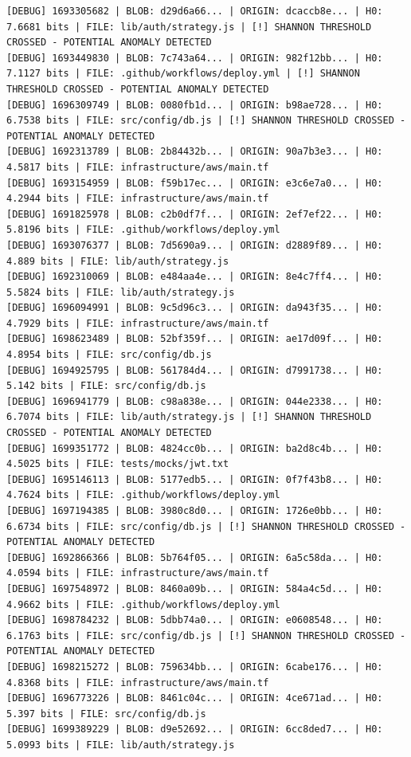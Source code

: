 \documentclass[12pt, a4paper, oneside]{report}
\begin{document}
\begin{lstlisting}[basicstyle=\tiny\ttfamily]
[DEBUG] 1693305682 | BLOB: d29d6a66... | ORIGIN: dcaccb8e... | H0: 7.6681 bits | FILE: lib/auth/strategy.js | [!] SHANNON THRESHOLD CROSSED - POTENTIAL ANOMALY DETECTED
[DEBUG] 1693449830 | BLOB: 7c743a64... | ORIGIN: 982f12bb... | H0: 7.1127 bits | FILE: .github/workflows/deploy.yml | [!] SHANNON THRESHOLD CROSSED - POTENTIAL ANOMALY DETECTED
[DEBUG] 1696309749 | BLOB: 0080fb1d... | ORIGIN: b98ae728... | H0: 6.7538 bits | FILE: src/config/db.js | [!] SHANNON THRESHOLD CROSSED - POTENTIAL ANOMALY DETECTED
[DEBUG] 1692313789 | BLOB: 2b84432b... | ORIGIN: 90a7b3e3... | H0: 4.5817 bits | FILE: infrastructure/aws/main.tf
[DEBUG] 1693154959 | BLOB: f59b17ec... | ORIGIN: e3c6e7a0... | H0: 4.2944 bits | FILE: infrastructure/aws/main.tf
[DEBUG] 1691825978 | BLOB: c2b0df7f... | ORIGIN: 2ef7ef22... | H0: 5.8196 bits | FILE: .github/workflows/deploy.yml
[DEBUG] 1693076377 | BLOB: 7d5690a9... | ORIGIN: d2889f89... | H0: 4.889 bits | FILE: lib/auth/strategy.js
[DEBUG] 1692310069 | BLOB: e484aa4e... | ORIGIN: 8e4c7ff4... | H0: 5.5824 bits | FILE: lib/auth/strategy.js
[DEBUG] 1696094991 | BLOB: 9c5d96c3... | ORIGIN: da943f35... | H0: 4.7929 bits | FILE: infrastructure/aws/main.tf
[DEBUG] 1698623489 | BLOB: 52bf359f... | ORIGIN: ae17d09f... | H0: 4.8954 bits | FILE: src/config/db.js
[DEBUG] 1694925795 | BLOB: 561784d4... | ORIGIN: d7991738... | H0: 5.142 bits | FILE: src/config/db.js
[DEBUG] 1696941779 | BLOB: c98a838e... | ORIGIN: 044e2338... | H0: 6.7074 bits | FILE: lib/auth/strategy.js | [!] SHANNON THRESHOLD CROSSED - POTENTIAL ANOMALY DETECTED
[DEBUG] 1699351772 | BLOB: 4824cc0b... | ORIGIN: ba2d8c4b... | H0: 4.5025 bits | FILE: tests/mocks/jwt.txt
[DEBUG] 1695146113 | BLOB: 5177edb5... | ORIGIN: 0f7f43b8... | H0: 4.7624 bits | FILE: .github/workflows/deploy.yml
[DEBUG] 1697194385 | BLOB: 3980c8d0... | ORIGIN: 1726e0bb... | H0: 6.6734 bits | FILE: src/config/db.js | [!] SHANNON THRESHOLD CROSSED - POTENTIAL ANOMALY DETECTED
[DEBUG] 1692866366 | BLOB: 5b764f05... | ORIGIN: 6a5c58da... | H0: 4.0594 bits | FILE: infrastructure/aws/main.tf
[DEBUG] 1697548972 | BLOB: 8460a09b... | ORIGIN: 584a4c5d... | H0: 4.9662 bits | FILE: .github/workflows/deploy.yml
[DEBUG] 1698784232 | BLOB: 5dbb74a0... | ORIGIN: e0608548... | H0: 6.1763 bits | FILE: src/config/db.js | [!] SHANNON THRESHOLD CROSSED - POTENTIAL ANOMALY DETECTED
[DEBUG] 1698215272 | BLOB: 759634bb... | ORIGIN: 6cabe176... | H0: 4.8368 bits | FILE: infrastructure/aws/main.tf
[DEBUG] 1696773226 | BLOB: 8461c04c... | ORIGIN: 4ce671ad... | H0: 5.397 bits | FILE: src/config/db.js
[DEBUG] 1699389229 | BLOB: d9e52692... | ORIGIN: 6cc8ded7... | H0: 5.0993 bits | FILE: lib/auth/strategy.js
\end{lstlisting}
\end{document}
